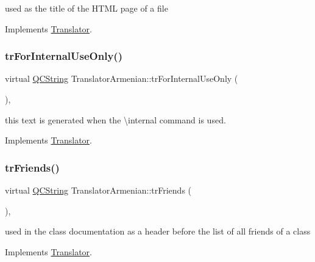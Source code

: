 used as the title of the H\+T\+ML page of a file 

Implements \mbox{\hyperlink{class_translator}{Translator}}.

\mbox{\label{class_translator_armenian_a7b7f3372299cce0f35f682cc85cae445}} 
\subsubsection{\texorpdfstring{trForInternalUseOnly()}{trForInternalUseOnly()}}
{\footnotesize\ttfamily virtual \mbox{\hyperlink{class_q_c_string}{Q\+C\+String}} Translator\+Armenian\+::tr\+For\+Internal\+Use\+Only (\begin{DoxyParamCaption}{ }\end{DoxyParamCaption})\hspace{0.3cm}{\ttfamily [inline]}, {\ttfamily [virtual]}}

this text is generated when the \textbackslash{}internal command is used. 

Implements \mbox{\hyperlink{class_translator}{Translator}}.

\mbox{\label{class_translator_armenian_aa1683efef87acb0953421d727692ac09}} 
\subsubsection{\texorpdfstring{trFriends()}{trFriends()}}
{\footnotesize\ttfamily virtual \mbox{\hyperlink{class_q_c_string}{Q\+C\+String}} Translator\+Armenian\+::tr\+Friends (\begin{DoxyParamCaption}{ }\end{DoxyParamCaption})\hspace{0.3cm}{\ttfamily [inline]}, {\ttfamily [virtual]}}

used in the class documentation as a header before the list of all friends of a class 

Implements \mbox{\hyperlink{class_translator}{Translator}}.

\mbox{\label{class_translator_armenian_a93d911e8eb332647f1d812caeb566c52}} 
